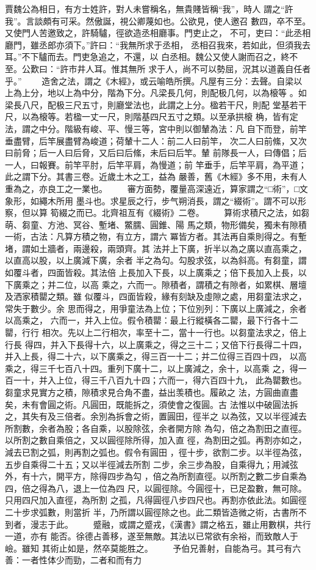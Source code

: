 \documentclass{ctexart}
\begin{document}
賈魏公為相日，有方士姓許，對人未嘗稱名，無貴賤皆稱``我''，時人 謂之``許我''。言談頗有可采。然傲誕，視公卿蔑如也。公欲見，使人邀召 數四，卒不至。又使門人苦邀致之，許騎驢，徑欲造丞相廳事。門吏止之， 不可，吏曰：``此丞相廳門，雖丞郎亦須下。''許曰：``我無所求于丞相， 丞相召我來，若如此，但須我去耳。''不下驢而去。門吏急追之，不還，以 白丞相。魏公又使人謝而召之，終不至。公歎曰：``許市井人耳。惟其無所 求于人，尚不可以勢屈，況其以道義自任者乎。'' 　　造舍之法，謂之《木經》，或云喻皓所撰。凡屋有三分：去聲。自梁以 上為上分，地以上為中分，階為下分。凡梁長几何，則配极几何，以為榱等 。如梁長八尺，配极三尺五寸，則廳堂法也，此謂之上分。楹若干尺，則配 堂基若干尺，以為榱等。若楹一丈一尺，則階基四尺五寸之類。以至承拱榱 桷，皆有定法，謂之中分。階級有峻、平、慢三等，宮中則以御輦為法：凡 自下而登，前竿垂盡臂，后竿展盡臂為峻道；荷輦十二人：前二人曰前竿， 次二人曰前絛，又次曰前脅；后一人曰后脅，又后曰后絛，未后曰后竿。輦 前隊長一人，曰傳倡；后一人，曰報賽。前竿平肘，后竿平肩，為慢道；前 竿垂手，后竿平肩，為平道；此之謂下分。其書三卷。近歲土木之工，益為 嚴善，舊《木經》多不用，未有人重為之，亦良工之一業也。 　　審方面勢，覆量高深遠近，算家謂之``□術''，□文象形，如繩木所用 墨斗也。求星辰之行，步气朔消長，謂之``綴術''。謂不可以形察，但以算 筍綴之而已。北齊祖亙有《綴術》二卷。 　　算術求積尺之法，如芻萌、芻童、方池、冥谷、塹堵、鱉臑、圓錐、陽 馬之類，物形備矣，獨未有隙積一術，古法：凡算方積之物，有立方，謂六 冪皆方者。其法再自乘則得之。有塹堵，謂如土牆者，兩邊殺，兩頭齊。其 法并上下廣，折半以為之廣以直高乘之，以直高以股，以上廣減下廣，余者 半之為勾。勾股求弦，以為斜高。有芻童，謂如覆斗者，四面皆殺。其法倍 上長加入下長，以上廣乘之；倍下長加入上長，以下廣乘之；并二位，以高 乘之，六而一。隙積者，謂積之有隙者，如累棋、層壇及洒家積罌之類。雖 似覆斗，四面皆殺，緣有刻缺及虛隙之處，用芻童法求之，常失于數少。余 思而得之，用爭童法為上位；下位別列：下廣以上廣減之，余者以高乘之， 六而一，并入上位。假令積罌：最上行縱橫各二罌，最下行各十二罌，行行 相次。先以上二行相次，率至十二，當十一行也。以芻童法求之，倍上行長 得四，并入下長得十六，以上廣乘之，得之三十二；又倍下行長得二十四， 并入上長，得二十六，以下廣乘之，得三百一十二；并二位得三百四十四， 以高乘之，得三千七百八十四。重列下廣十二，以上廣減之，余十，以高乘 之，得一百一十，并入上位，得三千八百九十四；六而一，得六百四十九， 此為罌數也。芻童求見實方之積，隙積求見合角不盡，益出羡積也。履畝之 法，方圓曲直盡矣，未有會圓之術。凡圓田，既能拆之，須使會之復圓。古 法惟以中破圓法拆之，其失有及三倍者。余別為拆會之術，置圓田，徑半之 以為弦，又以半徑減去所割數，余者為股；各自乘，以股除弦，余者開方除 為勾，倍之為割田之直徑。以所割之數自乘倍之，又以圓徑除所得，加入直 徑，為割田之弧。再割亦如之，減去已割之弧，則再割之弧也。假令有圓田 ，徑十步，欲割二步。以半徑為弦，五步自乘得二十五；又以半徑減去所割 二步，余三步為股，自乘得九；用減弦外，有十六，開平方，除得四步為勾 ，倍之為所割直徑。以所割之數二步自乘為四，倍之得為八，退上一位為四 尺，以圓徑除。今圓徑十，已足盈數，無可除。只用四尺加入直徑，為所割 之孤，凡得圓徑八步四尺也。再割亦依此法。如圓徑二十步求弧數，則當折 半，乃所謂以圓徑除之也。此二類皆造微之術，古書所不到者，漫志于此。 　　蹙融，或謂之蹙戎，《漢書》謂之格五，雖止用數棋，共行一道，亦有 能否。徐德占善移，遂至無敵。其法以已常欲有余裕，而致敵人于嶮。雖知 其術止如是，然卒莫能胜之。 　　予伯兄善射，自能為弓。其弓有六善：一者性体少而勁，二者和而有力 
\end{document}
